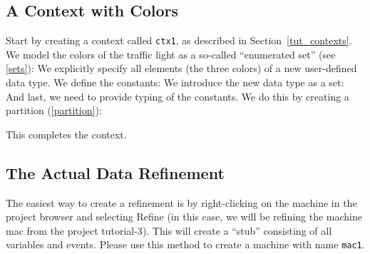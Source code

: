 \subsection{A Context with Colors}
\label{tut_context_with_colors}

Start by creating a context called \texttt{ctx1}, as described in Section~\ref{tut_contexts}.
We model the colors of the traffic light as a so-called ``enumerated set'' (see \ref{sets}): 
We explicitly specify all elements (the three colors) of a new user-defined data type.
We define the constants:
We introduce the new data type as a set:
And last, we need to provide typing of the constants.  We do this by creating a partition (\ref{partition}):


This completes the context.

\subsection{The Actual Data Refinement}
\label{tut_actual_data_refinement}

The easiest way to create a refinement is by right-clicking on the machine in the project browser and selecting \textsf{Refine} (in this case, we will be refining the machine \textsf{mac} from the project \textsf{tutorial-3}).  This will create a ``stub'' consisting of all variables and events. Please use this method to create a machine with name \texttt{mac1}.

